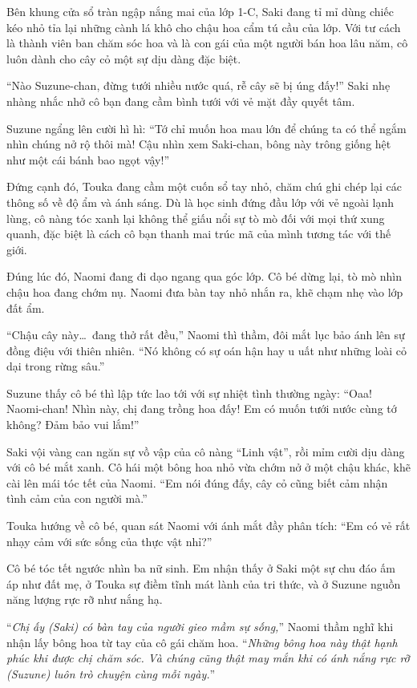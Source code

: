 \documentclass[../main.tex]{subfiles}
\begin{document}
Bên khung cửa sổ tràn ngập nắng mai của lớp 1-C, Saki đang tỉ mỉ dùng chiếc kéo nhỏ tỉa lại những cành lá khô cho chậu hoa cẩm tú cầu của lớp. Với tư cách là thành viên ban chăm sóc hoa và là con gái của một người bán hoa lâu năm, cô luôn dành cho cây cỏ một sự dịu dàng đặc biệt.

``Nào Suzune-chan, đừng tưới nhiều nước quá, rễ cây sẽ bị úng đấy!'' Saki nhẹ nhàng nhắc nhở cô bạn đang cầm bình tưới với vẻ mặt đầy quyết tâm.

Suzune ngẩng lên cười hì hì: ``Tớ chỉ muốn hoa mau lớn để chúng ta có thể ngắm nhìn chúng nở rộ thôi mà! Cậu nhìn xem Saki-chan, bông này trông giống hệt như một cái bánh bao ngọt vậy!''

Đứng cạnh đó, Touka đang cầm một cuốn sổ tay nhỏ, chăm chú ghi chép lại các thông số về độ ẩm và ánh sáng. Dù là học sinh đứng đầu lớp với vẻ ngoài lạnh lùng, cô nàng tóc xanh lại không thể giấu nổi sự tò mò đối với mọi thứ xung quanh, đặc biệt là cách cô bạn thanh mai trúc mã của mình tương tác với thế giới.

Đúng lúc đó, Naomi đang đi dạo ngang qua góc lớp. Cô bé dừng lại, tò mò nhìn chậu hoa đang chớm nụ. Naomi đưa bàn tay nhỏ nhắn ra, khẽ chạm nhẹ vào lớp đất ẩm.

``Chậu cây này\dots\ đang thở rất đều,'' Naomi thì thầm, đôi mắt lục bảo ánh lên sự đồng điệu với thiên nhiên. ``Nó không có sự oán hận hay u uất như những loài cỏ dại trong rừng sâu.''

Suzune thấy cô bé thì lập tức lao tới với sự nhiệt tình thường ngày: ``Oaa! Naomi-chan! Nhìn này, chị đang trồng hoa đấy! Em có muốn tưới nước cùng tớ không? Đảm bảo vui lắm!''

Saki vội vàng can ngăn sự vồ vập của cô nàng ``Linh vật'', rồi mỉm cười dịu dàng với cô bé mắt xanh. Cô hái một bông hoa nhỏ vừa chớm nở ở một chậu khác, khẽ cài lên mái tóc tết của Naomi. ``Em nói đúng đấy, cây cỏ cũng biết cảm nhận tình cảm của con người mà.''

Touka hướng về cô bé, quan sát Naomi với ánh mắt đầy phân tích: ``Em có vẻ rất nhạy cảm với sức sống của thực vật nhỉ?''

Cô bé tóc tết ngước nhìn ba nữ sinh. Em nhận thấy ở Saki một sự chu đáo ấm áp như đất mẹ, ở Touka sự điềm tĩnh mát lành của tri thức, và ở Suzune nguồn năng lượng rực rỡ như nắng hạ.

``\textit{Chị ấy (Saki) có bàn tay của người gieo mầm sự sống,}'' Naomi thầm nghĩ khi nhận lấy bông hoa từ tay của cô gái chăm hoa. ``\textit{Những bông hoa này thật hạnh phúc khi được chị chăm sóc. Và chúng cũng thật may mắn khi có ánh nắng rực rỡ (Suzune) luôn trò chuyện cùng mỗi ngày.}''
\end{document}
